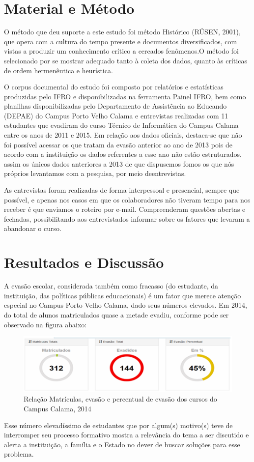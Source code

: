 \documentclass[article,12pt,onesidea,4paper,english,brazil]{abntex2}
\begin{document}
	\section*{Material e Método}
	
O método que deu suporte a este estudo foi método Histórico  (RÜSEN, 2001), que opera com a cultura do tempo presente e documentos diversificados, com vistas a produzir um conhecimento crítico a cercados fenômenos.O método foi selecionado por se mostrar adequado tanto à coleta dos dados, quanto às críticas de ordem hermenêutica e heurística.

O corpus documental do estudo foi composto por relatórios e estatísticas produzidas pelo IFRO e disponibilizadas na ferramenta Painel IFRO, bem como planilhas disponibilizadas pelo Departamento de Assistência ao Educando (DEPAE) do Campus Porto Velho Calama e entrevistas realizadas com 11 estudantes que evadiram do curso Técnico de Informática do Campus Calama entre os anos de 2011 e 2015. Em relação aos dados oficiais, destaca-se que não foi possível  acessar os que tratam da evasão anterior ao ano de 2013 pois de acordo com a instituição os dados referentes a esse ano não estão estruturados, assim os únicos dados anteriores a 2013 de que dispusemos fomos os que nós próprios levantamos com a pesquisa, por meio deentrevistas.

As entrevistas foram realizadas de forma interpessoal e presencial, sempre que possível, e apenas nos casos em que os colaboradores não tiveram tempo para nos receber é que enviamos o roteiro por e-mail. Compreenderam questões abertas e fechadas, possibilitando aos entrevistados informar sobre os fatores que levaram a abandonar o curso.
	
	\section*{Resultados e Discussão}
	
	A evasão escolar, considerada também como fracasso (do estudante, da instituição, das políticas públicas educacionais) é um fator que merece atenção especial no Campus Porto Velho Calama, dado seus números elevados. Em 2014, do total de alunos matriculados quase a metade evadiu, conforme pode ser observado na figura abaixo:
	\begin{figure}[h]
		\centering
		\includegraphics[width=0.7\linewidth]{pip-artigo09-01}
		\caption{Relação Matrículas, evasão e percentual de evasão dos cursos do Campus Calama, 2014}
		\label{fig:pip-artigo09-01}
	\end{figure}
	Esse número elevadíssimo de estudantes que por algum(s) motivo(s) teve de interromper seu processo formativo mostra a relevância do tema a ser discutido e alerta a instituição, a família e o Estado no dever de buscar soluções para esse problema.
	
\end{document}
